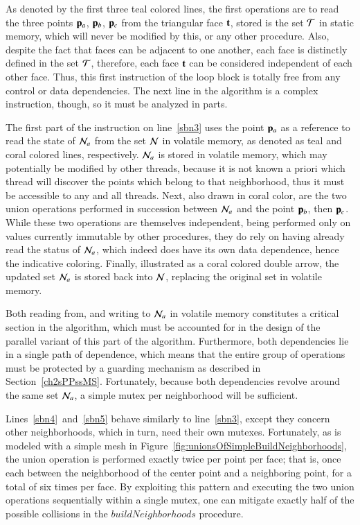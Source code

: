 As denoted by the first three teal colored lines, the first operations are to read the three points $\mathbf{p}_a$, $\mathbf{p}_b$, $\mathbf{p}_c$ from the triangular face $\mathbf{t}$, stored is the set $\mathcal{T}$ in static memory, which will never be modified by this, or any other procedure. Also, despite the fact that faces can be adjacent to one another, each face is distinctly defined in the set $\mathcal{T}$, therefore, each face $\mathbf{t}$ can be considered independent of each other face. Thus, this first instruction of the loop block is totally free from any control or data dependencies. The next line in the algorithm is a complex instruction, though, so it must be analyzed in parts.

The first part of the instruction on line~\ref{sbn3} uses the point $\mathbf{p}_a$ as a reference to read the state of $\mathcal{N}_a$ from the set $\mathcal{N}$ in volatile memory, as denoted as teal and coral colored lines, respectively. $\mathcal{N}_a$ is stored in volatile memory, which may potentially be modified by other threads, because it is not known a priori which thread will discover the points which belong to that neighborhood, thus it must be accessible to any and all threads. Next, also drawn in coral color, are the two union operations performed in succession between $\mathcal{N}_a$ and the point $\mathbf{p}_b$, then $\mathbf{p}_c$. While these two operations are themselves independent, being performed only on values currently immutable by other procedures, they do rely on having already read the status of $\mathcal{N}_a$, which indeed does have its own data dependence, hence the indicative coloring. Finally, illustrated as a coral colored double arrow, the updated set $\mathcal{N}_a$ is stored back into $\mathcal{N}$, replacing the original set in volatile memory.

Both reading from, and writing to $\mathcal{N}_a$ in volatile memory constitutes a critical section in the algorithm, which must be accounted for in the design of the parallel variant of this part of the algorithm. Furthermore, both dependencies lie in a single path of dependence, which means that the entire group of operations must be protected by a guarding mechanism as described in Section~\ref{ch2sPPssMS}. Fortunately, because both dependencies revolve around the same set $\mathcal{N}_a$, a simple mutex per neighborhood will be sufficient.

Lines~\ref{sbn4}~and~\ref{sbn5} behave similarly to line~\ref{sbn3}, except they concern other neighborhoods, which in turn, need their own mutexes. Fortunately, as is modeled with a simple mesh in Figure~\ref{fig:unionsOfSimpleBuildNeighborhoods}, the union operation is performed exactly twice per point per face; that is, once each between the neighborhood of the center point and a neighboring point, for a total of six times per face. By exploiting this pattern and executing the two union operations sequentially within a single mutex, one can mitigate exactly half of the possible collisions in the $\mathit{buildNeighborhoods}$ procedure.

